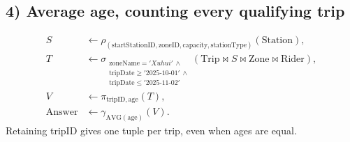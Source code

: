 \documentclass[11pt,a4paper]{article}
\begin{document}
\subsection*{4) Average age, counting every qualifying trip}
\begin{align*}
S&\leftarrow\rho_{(\mathrm{startStationID},\mathrm{zoneID},\mathrm{capacity},\mathrm{stationType})}
 (\mathrm{Station}),\\
T&\leftarrow\sigma_{\substack{\mathrm{zoneName}='Xuhui'\,\land\\
\mathrm{tripDate}\ge '2025\text{-}10\text{-}01'\,\land\\
\mathrm{tripDate}\le '2025\text{-}11\text{-}02'}}
 (\mathrm{Trip}\bowtie S\bowtie\mathrm{Zone}\bowtie\mathrm{Rider}),\\
V&\leftarrow\pi_{\mathrm{tripID},\mathrm{age}}(T),\\[3pt]
\boxed{\mathrm{Answer}}&\boxed{\leftarrow\gamma_{\mathrm{AVG}(\mathrm{age})}(V)}.
\end{align*}
Retaining tripID gives one tuple per trip, even when ages are equal.
\end{document}
